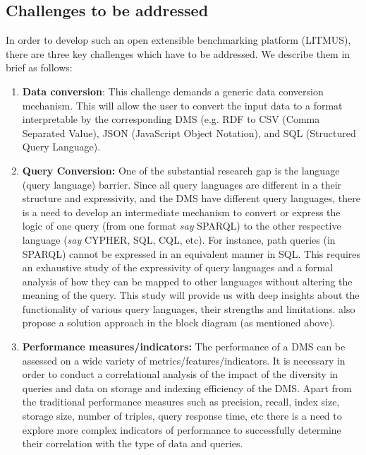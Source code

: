 \documentclass{llncs}
\begin{document}
    \subsection{Challenges to be addressed}
    In order to develop such an open extensible benchmarking platform (LITMUS), there are three key challenges which have to be addressed. We describe them in brief as follows:
        \begin{enumerate}
            \item {}\textbf{ Data conversion}: This challenge demands a generic data conversion mechanism. This will allow the user to convert the input data to a format interpretable by the corresponding DMS (e.g. RDF to CSV (Comma Separated Value), JSON (JavaScript Object Notation),  and SQL (Structured Query Language).
            \item {} \textbf{Query Conversion:} 
            One of the substantial research gap is the language (query language) barrier. Since all query languages are different in a their structure and expressivity, and the DMS have different query languages, there is a need to develop an intermediate mechanism to convert or express the logic of one query (from one format \textit{say} SPARQL) to the other respective language (\textit{say} CYPHER, SQL, CQL, etc). For instance, path queries (in SPARQL) cannot be expressed in an equivalent manner in SQL. This requires an exhaustive study of the expressivity of query languages and a formal analysis of how they can be mapped to other languages without altering the meaning of the query. This study will provide us with deep insights about the functionality of various query languages, their strengths and limitations.
            also propose a solution approach in the block diagram (as mentioned above).
            \item {} \textbf{Performance measures/indicators:} 
            The performance of a DMS can be assessed on a wide variety of metrics/features/indicators. It is necessary in order to conduct a correlational analysis of the impact of the diversity in queries and data on storage and indexing efficiency of the DMS. Apart from the traditional performance measures such as precision, recall, index size, storage size, number of triples, query response time, etc there is a need to explore more complex indicators of performance to successfully determine their correlation with the type of data and queries.
        \end{enumerate}
    
\end{document}
